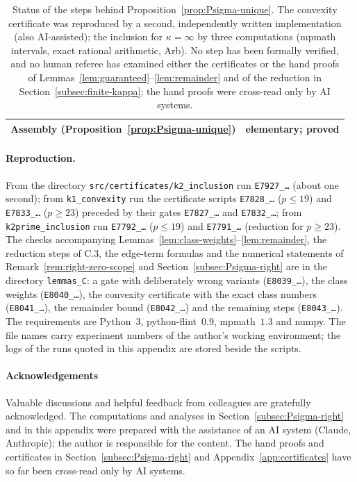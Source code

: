 \begin{table}[!h]
\begin{tabular}{p{}p{}}
Assembly (Proposition~\ref{prop:Psigma-unique}) & elementary; proved\\
\hline
\end{tabular}
\caption{Status of the steps behind Proposition~\ref{prop:Psigma-unique}. The convexity certificate was reproduced by a second, independently written implementation (also AI-assisted); the inclusion for $\kappa=\infty$ by three computations (mpmath intervals, exact rational arithmetic, Arb). No step has been formally verified, and no human referee has examined either the certificates or the hand proofs of Lemmas~\ref{lem:guaranteed}--\ref{lem:remainder} and of the reduction in Section~\ref{subsec:finite-kappa}; the hand proofs were cross-read only by AI systems.}
\label{tab:cert-status}
\end{table}

\paragraph*{Reproduction.} From the directory \texttt{src/certificates/k2\_inclusion} run \texttt{E7927\_\ldots} (about one second); from \texttt{k1\_convexity} run the certificate scripts \texttt{E7828\_\ldots} ($p\le19$) and \texttt{E7833\_\ldots} ($p\ge23$) preceded by their gates \texttt{E7827\_\ldots} and \texttt{E7832\_\ldots}; from \texttt{k2prime\_inclusion} run \texttt{E7792\_\ldots} ($p\le19$) and \texttt{E7791\_\ldots} (reduction for $p\ge23$). The checks accompanying Lemmas~\ref{lem:class-weights}--\ref{lem:remainder}, the reduction steps of C.3, the edge-term formulas and the numerical statements of Remark~\ref{rem:right-zero-scope} and Section~\ref{subsec:Psigma-right} are in the directory \texttt{lemmas\_C}: a gate with deliberately wrong variants (\texttt{E8039\_\ldots}), the class weights (\texttt{E8040\_\ldots}), the convexity certificate with the exact class numbers (\texttt{E8041\_\ldots}), the remainder bound (\texttt{E8042\_\ldots}) and the remaining steps (\texttt{E8043\_\ldots}). The requirements are Python~3, python-flint~$0.9$, mpmath~$1.3$ and numpy. The file names carry experiment numbers of the author's working environment; the logs of the runs quoted in this appendix are stored beside the scripts.

\paragraph*{Acknowledgements}
Valuable discussions and helpful feedback from colleagues are gratefully acknowledged. The computations and analyses in Section~\ref{subsec:Psigma-right} and in this appendix were prepared with the assistance of an AI system (Claude, Anthropic); the author is responsible for the content. The hand proofs and certificates in Section~\ref{subsec:Psigma-right} and Appendix~\ref{app:certificates} have so far been cross-read only by AI systems.
